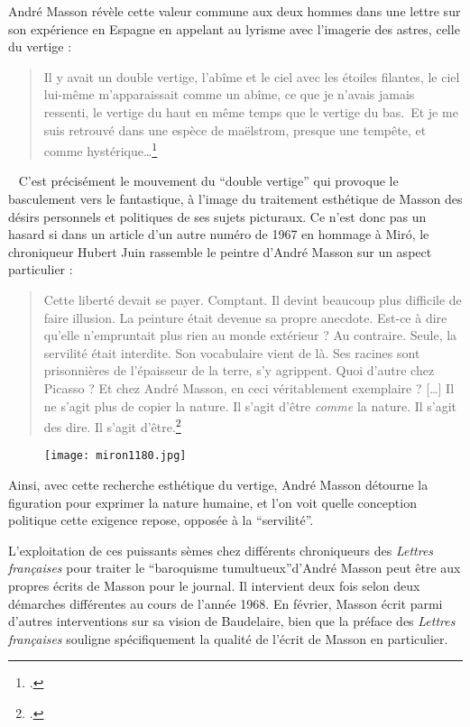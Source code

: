 André Masson révèle cette valeur commune aux deux hommes dans une lettre sur son expérience en Espagne en appelant au lyrisme avec l’imagerie des astres, celle du vertige : 
\begin{quote}
Il y avait un double vertige, l’abîme et le ciel avec les étoiles filantes, le ciel lui-même m’apparaissait comme un abîme, ce que je n’avais jamais ressenti, le vertige du haut en même temps que le vertige du bas. Et je me suis retrouvé dans une espèce de maëlstrom, presque une tempête, et comme hystérique…\footcite{mythologie}\end{quote}
 
	 C’est précisément le mouvement du \enquote{double vertige} qui provoque le basculement vers le fantastique, à l’image du traitement esthétique de Masson des désirs personnels et politiques de ses sujets picturaux. Ce n’est donc pas un hasard si dans un article d’un autre numéro de 1967 en hommage à Miró, le chroniqueur Hubert Juin rassemble le peintre d'André Masson sur un aspect particulier : 
\begin{quote}
Cette liberté devait se payer. Comptant. Il devint beaucoup plus difficile de faire illusion. La peinture était devenue sa propre anecdote. Est-ce à dire qu’elle n’empruntait plus rien au monde extérieur ?  Au contraire. Seule, la servilité était interdite. Son vocabulaire vient de là. Ses racines sont prisonnières de l’épaisseur de la terre, s’y agrippent. Quoi d’autre chez Picasso ? Et chez André Masson, en ceci véritablement exemplaire ? […] Il ne s’agit plus de copier la nature. Il s’agit d’être \emph{comme} la nature. Il s’agit des dire. Il s’agit d’être.\footcite{joanmiro}\end{quote}	 


\begin{figure}[H]
   \centering
   \texttt{[image: miron1180.jpg]}
	\caption{\cite{joanmiro}}\label{fig:Miro}
\end{figure}

	Ainsi, avec cette recherche esthétique du vertige, André Masson détourne la figuration pour exprimer la nature humaine, et l’on voit  quelle conception politique cette exigence repose, opposée à la \enquote{servilité}. 

	L’exploitation de ces puissants sèmes chez différents chroniqueurs des \emph{Lettres françaises} pour traiter le \enquote{baroquisme tumultueux}d’André Masson peut être aux propres écrits de Masson  pour le journal. Il intervient deux fois selon deux démarches différentes au cours de l’année 1968. En février, Masson écrit parmi d’autres interventions sur sa vision de Baudelaire, bien que la préface des \emph{Lettres françaises} souligne spécifiquement la qualité de l’écrit de Masson en particulier. 

